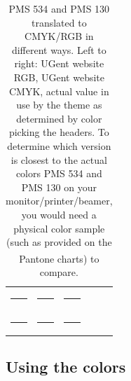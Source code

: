 \documentclass[a4paper,10pt]{article}
\theoremstyle{definition}
\begin{document}
\newlength\boxsize
\setlength\boxsize{2cm}
\begin{table}
  \centering
  \begin{tabular}{cccc}
    \definecolor{ugentbluergb}{RGB}{10,30,96}\colorbox{ugentbluergb}{\rule{0mm}{\boxsize}\rule{\boxsize}{0mm}}
    & \definecolor{ugentbluecmyk}{cmyk}{0.8726,0.6981,0.2617,0.0436}\colorbox{ugentbluecmyk}{\rule{0mm}{\boxsize}\rule{\boxsize}{0mm}}
    & \colorbox{ugentblue}{\rule{0mm}{\boxsize}\rule{\boxsize}{0mm}} \\[2mm]
    \definecolor{ugentyellowrgb}{RGB}{255,179,0}\colorbox{ugentyellowrgb}{\rule{0mm}{\boxsize}\rule{\boxsize}{0mm}}
    & \definecolor{ugentyellowcmyk}{cmyk}{0,0.2617,0.8726,0}\colorbox{ugentyellowcmyk}{\rule{0mm}{\boxsize}\rule{\boxsize}{0mm}}
    & \colorbox{ugentyellow}{\rule{0mm}{\boxsize}\rule{\boxsize}{0mm}} \\[2mm]
  \end{tabular}
  \caption{PMS 534 and PMS 130 translated to CMYK/RGB in different ways. Left to right: UGent website \cite{ugent-color-guide} RGB, UGent website \cite{ugent-color-guide} CMYK, actual value in use by the theme as determined by color picking the headers. To determine which version is closest to the actual colors PMS 534 and PMS 130 on your monitor/printer/beamer, you would need a physical color sample (such as provided on the Pantone\textsuperscript{\textregistered} charts) to compare.}
  \label{table:blues-and-yellows}
\end{table}

\subsection{Using the colors}\label{subsection:usingthecolors}
\end{document}
